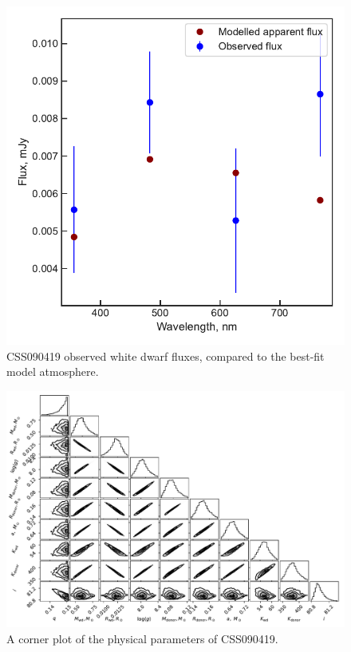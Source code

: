 \begin{figure}
    \centering
    \includegraphics[width=\textwidth]{figures/results/CSS090419/fluxplot.pdf}
    \caption{CSS090419 observed white dwarf fluxes, compared to the best-fit model atmosphere.}
    \label{fig:CSS090419 flux plot}
\end{figure}
\begin{figure}
    \includegraphics[height=\textwidth, angle=90]{figures/results/physicalparams_corners/CSS090419_physcorner.pdf}
    \caption{A corner plot of the physical parameters of CSS090419.}
\end{figure}
\clearpage



